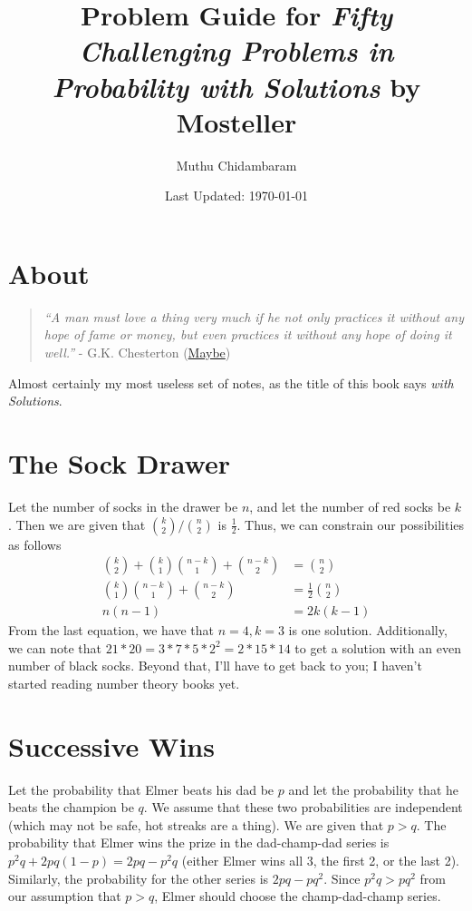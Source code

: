 \documentclass{article}
\begin{document}
\title{Problem Guide for \textit{Fifty Challenging Problems in Probability with Solutions} by Mosteller}
\author{Muthu Chidambaram}
\date{Last Updated: \today}

\maketitle

\tableofcontents
\newpage 

\section*{About}

\begin{quote}
        \textit{``A man must love a thing very much if he not only practices it without any hope of fame or money, but even practices it without any hope of doing it well.''} 
        - G.K. Chesterton (\href{https://mathoverflow.net/questions/43690/whats-a-mathematician-to-do/44213#44213}{Maybe})
\end{quote}

Almost certainly my most useless set of notes, as the title of this book says \textit{with Solutions}. 

\newpage

\section{The Sock Drawer}
Let the number of socks in the drawer be $n$, and let the number of red socks be $k$. Then we are given that
$\binom{k}{2} / \binom{n}{2}$ is $\frac{1}{2}$. Thus, we can constrain our possibilities as follows
\begin{align*}
        \binom{k}{2} + \binom{k}{1} \binom{n - k}{1} + \binom{n - k}{2} &= \binom{n}{2} \\
        \binom{k}{1} \binom{n - k}{1} + \binom{n - k}{2} &= \frac{1}{2} \binom{n}{2} \\
        n(n - 1) &= 2k(k - 1)
\end{align*}
From the last equation, we have that $n = 4, k = 3$ is one solution. Additionally, we can note that
 $21 * 20 = 3 * 7 * 5 * 2^2 = 2 * 15 * 14$ to get a solution with an even number of black socks. 
 Beyond that, I'll have to get back to you; I haven't started reading number theory books yet.

\section{Successive Wins}
Let the probability that Elmer beats his dad be $p$ and let the probability that he beats the champion be $q$.
We assume that these two probabilities are independent (which may not be safe, hot streaks are a thing).
We are given that  $p > q$. The probability that Elmer wins the prize in the dad-champ-dad series is
$p^2q + 2pq(1-p) = 2pq - p^2q$ (either Elmer wins all 3, the first 2, or the last 2). Similarly, the 
probability for the other series is  $2pq - pq^2$. Since $p^2q > pq^2$ from our assumption that $p > q$,
Elmer should choose the champ-dad-champ series.
\end{document}
